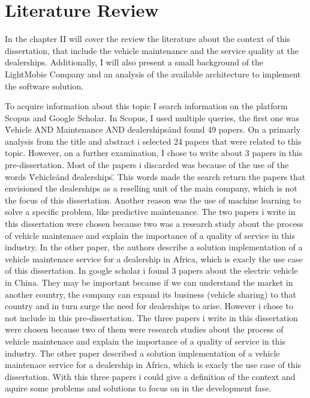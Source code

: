 \chapter{Literature Review}%
\label{chapter:literatureReview}

\begin{introduction}
In the chapter II will cover the review the literature about the context of this dissertation, that include the vehicle maintenance and the service quality at the dealerships. 
Additionally, I will also present a small background of the LightMobie Company and an analysis of the available architecture to implement the software solution.
\end{introduction} 


To acquire information about this topic I search information on the platform Scopus and Google Scholar. 
In Scopus, I used multiple queries, the first one was \"Vehicle AND Maintenance AND dealerships\" and found 49 papers.
On a primarly analysis from the title and abstract i selected 24 papers that were related to this topic.
However, on a further examination, I chose to write about 3 papers in this pre-dissertation. 
Most of the papers i discarded was because of the use of the words \"Vehicle\" and \"dealerships\". 
This words made the search return the papers that envisioned the dealerships as a reselling unit of the main company, which is not the focus of this dissertation.
Another reason was the use of machine learning to solve a specific problem, like predictive maintenance. 
The two papers i write in this dissertation were chosen because two was a research study about the process of vehicle maintenace and explain the importance of a quality of service in this industry.
In the other paper, the authors describe a solution implementation of a vehicle maintenace service for a dealership in Africa, which is exacly the use case of this dissertation.
In google scholar i found 3 papers about the electric vehicle in China. 
They may be important because if we can understand the market in another country, the company can expand its business (vehicle sharing) to that country and in turn surge the need for dealerships to arise.
However i chose to not include in this pre-dissertation.  
The three papers i write in this dissertation were chosen because two of them were research studies about the process of vehicle maintenace and explain the importance of a quality of service in this industry.
The other paper described a solution implementation of a vehicle maintenace service for a dealership in Africa, which is exacly the use case of this dissertation.
With this three papers i could give a definition of the context and aquire some problems and solutions to focus on in the development fase.  



